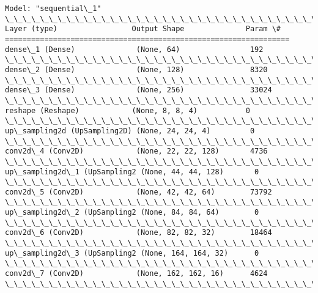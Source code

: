 \documentclass[11pt]{article}
\begin{document}
    \begin{Verbatim}[commandchars=\\\{\}]
Model: "sequential\_1"
\_\_\_\_\_\_\_\_\_\_\_\_\_\_\_\_\_\_\_\_\_\_\_\_\_\_\_\_\_\_\_\_\_\_\_\_\_\_\_\_\_\_\_\_\_\_\_\_\_\_\_\_\_\_\_\_\_\_\_\_\_\_\_\_\_
Layer (type)                 Output Shape              Param \#
=================================================================
dense\_1 (Dense)              (None, 64)                192
\_\_\_\_\_\_\_\_\_\_\_\_\_\_\_\_\_\_\_\_\_\_\_\_\_\_\_\_\_\_\_\_\_\_\_\_\_\_\_\_\_\_\_\_\_\_\_\_\_\_\_\_\_\_\_\_\_\_\_\_\_\_\_\_\_
dense\_2 (Dense)              (None, 128)               8320
\_\_\_\_\_\_\_\_\_\_\_\_\_\_\_\_\_\_\_\_\_\_\_\_\_\_\_\_\_\_\_\_\_\_\_\_\_\_\_\_\_\_\_\_\_\_\_\_\_\_\_\_\_\_\_\_\_\_\_\_\_\_\_\_\_
dense\_3 (Dense)              (None, 256)               33024
\_\_\_\_\_\_\_\_\_\_\_\_\_\_\_\_\_\_\_\_\_\_\_\_\_\_\_\_\_\_\_\_\_\_\_\_\_\_\_\_\_\_\_\_\_\_\_\_\_\_\_\_\_\_\_\_\_\_\_\_\_\_\_\_\_
reshape (Reshape)            (None, 8, 8, 4)           0
\_\_\_\_\_\_\_\_\_\_\_\_\_\_\_\_\_\_\_\_\_\_\_\_\_\_\_\_\_\_\_\_\_\_\_\_\_\_\_\_\_\_\_\_\_\_\_\_\_\_\_\_\_\_\_\_\_\_\_\_\_\_\_\_\_
up\_sampling2d (UpSampling2D) (None, 24, 24, 4)         0
\_\_\_\_\_\_\_\_\_\_\_\_\_\_\_\_\_\_\_\_\_\_\_\_\_\_\_\_\_\_\_\_\_\_\_\_\_\_\_\_\_\_\_\_\_\_\_\_\_\_\_\_\_\_\_\_\_\_\_\_\_\_\_\_\_
conv2d\_4 (Conv2D)            (None, 22, 22, 128)       4736
\_\_\_\_\_\_\_\_\_\_\_\_\_\_\_\_\_\_\_\_\_\_\_\_\_\_\_\_\_\_\_\_\_\_\_\_\_\_\_\_\_\_\_\_\_\_\_\_\_\_\_\_\_\_\_\_\_\_\_\_\_\_\_\_\_
up\_sampling2d\_1 (UpSampling2 (None, 44, 44, 128)       0
\_\_\_\_\_\_\_\_\_\_\_\_\_\_\_\_\_\_\_\_\_\_\_\_\_\_\_\_\_\_\_\_\_\_\_\_\_\_\_\_\_\_\_\_\_\_\_\_\_\_\_\_\_\_\_\_\_\_\_\_\_\_\_\_\_
conv2d\_5 (Conv2D)            (None, 42, 42, 64)        73792
\_\_\_\_\_\_\_\_\_\_\_\_\_\_\_\_\_\_\_\_\_\_\_\_\_\_\_\_\_\_\_\_\_\_\_\_\_\_\_\_\_\_\_\_\_\_\_\_\_\_\_\_\_\_\_\_\_\_\_\_\_\_\_\_\_
up\_sampling2d\_2 (UpSampling2 (None, 84, 84, 64)        0
\_\_\_\_\_\_\_\_\_\_\_\_\_\_\_\_\_\_\_\_\_\_\_\_\_\_\_\_\_\_\_\_\_\_\_\_\_\_\_\_\_\_\_\_\_\_\_\_\_\_\_\_\_\_\_\_\_\_\_\_\_\_\_\_\_
conv2d\_6 (Conv2D)            (None, 82, 82, 32)        18464
\_\_\_\_\_\_\_\_\_\_\_\_\_\_\_\_\_\_\_\_\_\_\_\_\_\_\_\_\_\_\_\_\_\_\_\_\_\_\_\_\_\_\_\_\_\_\_\_\_\_\_\_\_\_\_\_\_\_\_\_\_\_\_\_\_
up\_sampling2d\_3 (UpSampling2 (None, 164, 164, 32)      0
\_\_\_\_\_\_\_\_\_\_\_\_\_\_\_\_\_\_\_\_\_\_\_\_\_\_\_\_\_\_\_\_\_\_\_\_\_\_\_\_\_\_\_\_\_\_\_\_\_\_\_\_\_\_\_\_\_\_\_\_\_\_\_\_\_
conv2d\_7 (Conv2D)            (None, 162, 162, 16)      4624
\_\_\_\_\_\_\_\_\_\_\_\_\_\_\_\_\_\_\_\_\_\_\_\_\_\_\_\_\_\_\_\_\_\_\_\_\_\_\_\_\_\_\_\_\_\_\_\_\_\_\_\_\_\_\_\_\_\_\_\_\_\_\_\_\_

\end{Verbatim}
\end{document}
